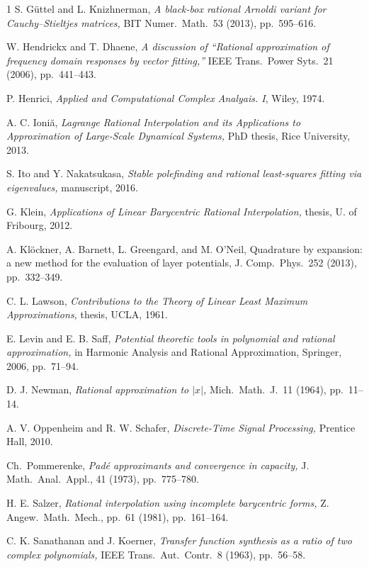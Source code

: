 \documentclass[final]{siamltex}
\begin{document}
\begin{thebibliography}{1}
{\sc S. G\"uttel and L. Knizhnerman,}
{\em A black-box rational Arnoldi variant for Cauchy--Stieltjes matrices,}
BIT Numer.\ Math.\ 53 (2013), pp.~595--616.

{\sc W. Hendrickx and T. Dhaene,}
{\em A discussion of ``Rational approximation of
frequency domain responses by vector fitting,''}
IEEE Trans.\ Power Syts.\ 21 (2006), pp.~441--443.

{\sc P. Henrici,} {\em Applied and
Computational Complex Analyais. I}, Wiley, 1974.

{\sc A. C. Ioni\u a,}
{\em Lagrange Rational Interpolation and its Applications
to Approximation of Large-Scale Dynamical Systems,}
PhD thesis, Rice University, 2013.

{\sc S. Ito and Y. Nakatsukasa,}
{\em Stable polefinding and rational least-squares fitting via eigenvalues,}
manuscript, 2016.

{\sc G. Klein,} {\em Applications of
Linear Barycentric Rational Interpolation,}
thesis, U. of Fribourg, 2012.

{\sc A. Kl\"ockner, A. Barnett, L. Greengard, and M.
O'Neil,} Quadrature by expansion: a new method for
the evaluation of layer potentials, J. Comp.\ Phys.\ 252
(2013), pp.~332--349.

{\sc C. L. Lawson,} {\em Contributions
to the Theory of Linear Least Maximum Approximations,} thesis, UCLA, 1961.

{\sc E. Levin and E. B. Saff,}
{\em Potential theoretic tools in polynomial and
rational approximation,}
in Harmonic Analysis and Rational Approximation,
Springer, 2006, pp.~71--94.

{\sc D. J. Newman,} {\em Rational approximation to $|x|$,}
Mich.\ Math.\ J.\ 11 (1964), pp.~11--14.

{\sc A. V. Oppenheim and R. W. Schafer,}
{\em Discrete-Time Signal Processing,} Prentice Hall, 2010.

{\sc Ch.\ Pommerenke,}
{\em Pad\'e approximants and convergence in
capacity,} J. Math.\ Anal.\ Appl., 41 (1973), pp.~775--780.

{\sc H. E. Salzer,} {\em Rational interpolation using
incomplete barycentric forms,}
Z. Angew.\ Math.\ Mech., pp.~61 (1981), pp.~161--164.

{\sc C. K. Sanathanan and J. Koerner,} {\em Transfer function
synthesis as a ratio of two complex polynomials,}
IEEE Trans.\ Aut.\ Contr.\ 8 (1963), pp.~56--58.


\end{thebibliography}
\end{document}
